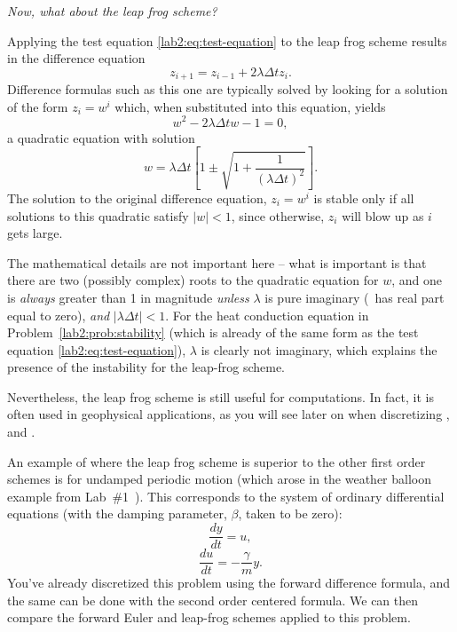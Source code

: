 \begin{example}
  \label{lab2:exm:test-leap-frog}
  \emph{ Now, what about the leap frog scheme?}

  Applying the test equation \eqref{lab2:eq:test-equation} to the leap
  frog scheme results in the difference equation
  \[
  z_{i+1} = z_{i-1} + 2 \lambda \Delta t z_i.
  \]
  Difference formulas such as this one are typically solved by looking
  for a solution of the form $z_i = w^i$ which, when substituted into
  this equation, yields
  \[ w^2 - 2\lambda\Delta t w - 1 = 0,\]
  a quadratic equation with solution
  \[ 
    w = \lambda \Delta t \left[ 1 \pm \sqrt{1+\frac{1}{(\lambda
        \Delta t)^2}} \right].
  \]
  The solution to the original difference equation, $z_i=w^i$ is
  stable only if all solutions to this quadratic satisfy $|w|<1$,
  since otherwise, $z_i$ will blow up as $i$ gets large.
 
  The mathematical details are not important here -- what is important
  is that there are two (possibly complex) roots to the quadratic
  equation for $w$,
  and one is \emph{ always} greater than 1 in magnitude \emph{ unless}
  $\lambda$ is pure imaginary (\ie~has real part equal to zero), \emph{
    and} $|\lambda \Delta t|<1$. 
  For the heat conduction equation in
  Problem~\ref{lab2:prob:stability} (which is already of the same form as
  the test equation \eqref{lab2:eq:test-equation}), $\lambda$ is
  clearly not imaginary, which explains the presence of the
  instability for the leap-frog scheme.

  Nevertheless, the leap frog scheme is still useful for
  computations.  In fact, it is often used in geophysical
  applications, as you will see later on when discretizing 
  , and
  .

  An example of where the leap frog scheme is superior to the other
  first order schemes is for undamped periodic motion (which arose
  in the weather balloon example from
  Lab~\#1~).  This corresponds to the
  system of ordinary differential equations (with the damping
  parameter, $\beta$, taken to be zero):
  \[ \frac{dy}{dt} = u, \]
  \[ \frac{du}{dt} = - \frac{\gamma}{m} y. \]
  You've already discretized this problem using the forward difference
  formula, and the same can be done with the second order centered
  formula.   We can then compare the forward Euler and leap-frog
  schemes applied to this problem.  


\end{example}
